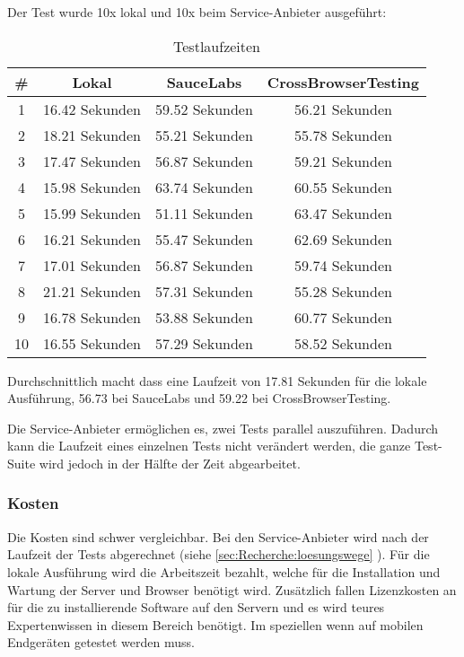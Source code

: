 Der Test wurde 10x lokal und 10x beim Service-Anbieter ausgeführt:
\begin{table}[H] 
	\caption{Testlaufzeiten}
	\centering
		
	\begin{tabular}{ | c | c | c | c |} 
		\hline 
			\rowcolor{tableheadcolor}
				 \bfseries \# & 
				 \bfseries Lokal & 
				 \bfseries SauceLabs &
				 \bfseries CrossBrowserTesting \\ \hline 
			1 & 16.42 Sekunden & 59.52 Sekunden & 56.21 Sekunden \\ \hline 
			2 & 18.21 Sekunden & 55.21 Sekunden & 55.78 Sekunden \\ \hline 
			3 & 17.47 Sekunden & 56.87 Sekunden & 59.21 Sekunden \\ \hline 
			4 & 15.98 Sekunden & 63.74 Sekunden & 60.55 Sekunden \\ \hline 
			5 & 15.99 Sekunden & 51.11 Sekunden & 63.47 Sekunden \\ \hline 
			6 & 16.21 Sekunden & 55.47 Sekunden & 62.69 Sekunden \\ \hline 
			7 & 17.01 Sekunden & 56.87 Sekunden & 59.74 Sekunden \\ \hline 
			8 & 21.21 Sekunden & 57.31 Sekunden & 55.28 Sekunden \\ \hline 
			9 & 16.78 Sekunden & 53.88 Sekunden & 60.77 Sekunden \\ \hline 
			10 & 16.55 Sekunden & 57.29 Sekunden & 58.52 Sekunden \\ \hline 
	\end{tabular} 
\end{table}
Durchschnittlich macht dass eine Laufzeit von 17.81 Sekunden für die lokale Ausführung, 56.73 bei SauceLabs und 59.22 bei CrossBrowserTesting.

Die Service-Anbieter ermöglichen es, zwei Tests parallel auszuführen. Dadurch kann die Laufzeit eines einzelnen Tests nicht verändert werden, die ganze Test-Suite wird jedoch in der Hälfte der Zeit abgearbeitet.

\subsubsection{Kosten}
Die Kosten sind schwer vergleichbar. Bei den Service-Anbieter wird nach der Laufzeit der Tests abgerechnet (siehe \cref{sec:Recherche:loesungswege} ). Für die lokale Ausführung wird die Arbeitszeit bezahlt, welche für die Installation und Wartung der Server und Browser benötigt wird. Zusätzlich fallen Lizenzkosten an für die zu installierende Software auf den Servern und es wird teures Expertenwissen in diesem Bereich benötigt. Im speziellen wenn auf mobilen Endgeräten getestet werden muss.

